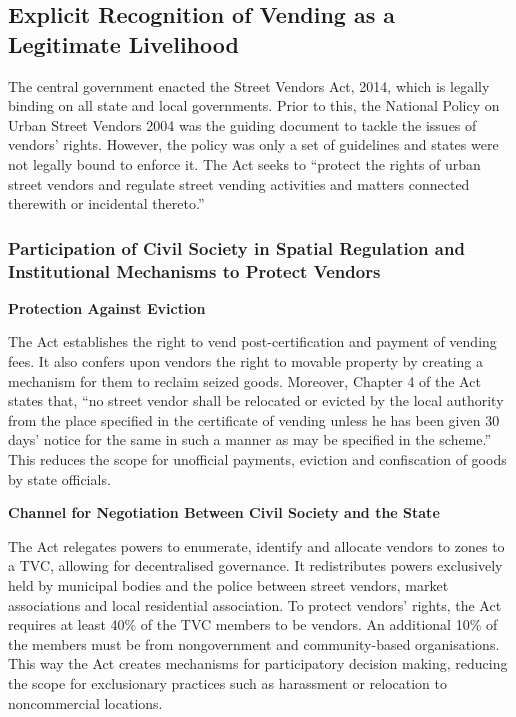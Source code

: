 \documentclass[a4paper, 12pt, twoside]{article}
\begin{document}
{\subsection*{Explicit Recognition of Vending as a Legitimate Livelihood}

The central government enacted the Street Vendors Act, 2014, which is legally binding on all state and local governments. Prior to this, the National Policy on Urban Street Vendors 2004 was the guiding document to tackle the issues of vendors’ rights. However, the policy was only a set of guidelines and states were not legally bound to enforce it. The Act seeks to “protect the rights of urban street vendors and regulate street vending activities and matters connected therewith or incidental thereto.”

\subsubsection*{Participation of Civil Society in Spatial Regulation and Institutional Mechanisms to Protect Vendors}

\textbf{Protection Against Eviction}

The Act establishes the right to vend post-certification and payment of vending fees. It also confers upon vendors the right to movable property by creating a mechanism for them to reclaim seized goods. Moreover, Chapter 4 of the Act states that, “no street vendor shall be relocated or evicted by the local authority from the place specified in the certificate of vending unless he has been given 30 days’ notice for the same in such a manner as may be specified in the scheme.” This reduces the scope for unofficial payments, eviction and confiscation of goods by state officials.

\textbf{Channel for Negotiation Between Civil Society and the State}

The Act relegates powers to enumerate, identify and allocate vendors to zones to a TVC, allowing for decentralised governance. It redistributes powers exclusively held by municipal bodies and the police between street vendors, market associations and local residential association. To protect vendors’ rights, the Act requires at least 40\% of the TVC members to be vendors. An additional 10\% of the members must be from nongovernment and community-based organisations. This way the Act creates mechanisms for participatory decision making, reducing the scope for exclusionary practices such as harassment or relocation to noncommercial locations.

}
\end{document}
